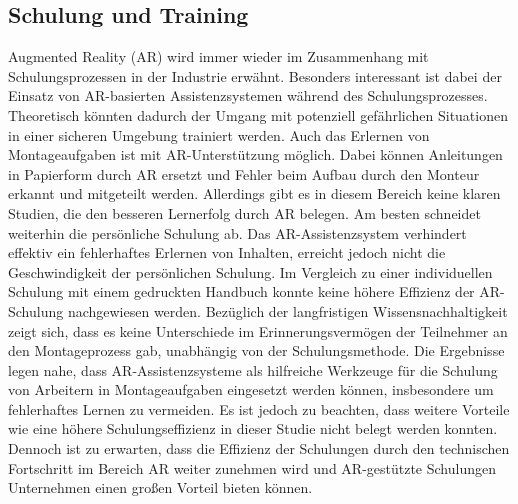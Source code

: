 \subsection{Schulung und Training}
Augmented Reality (AR) wird immer wieder im Zusammenhang mit Schulungsprozessen
in der Industrie erwähnt. Besonders interessant ist dabei der Einsatz von
AR-basierten Assistenzsystemen während des Schulungsprozesses. Theoretisch
könnten dadurch der Umgang mit potenziell gefährlichen Situationen in einer
sicheren Umgebung trainiert werden. Auch das Erlernen von Montageaufgaben ist
mit AR-Unterstützung möglich. Dabei können Anleitungen in Papierform durch AR
ersetzt und Fehler beim Aufbau durch den Monteur erkannt und mitgeteilt werden.
Allerdings gibt es in diesem Bereich keine klaren Studien, die den besseren
Lernerfolg durch AR belegen. Am besten schneidet weiterhin die persönliche
Schulung ab. Das AR-Assistenzsystem verhindert effektiv ein fehlerhaftes
Erlernen von Inhalten, erreicht jedoch nicht die Geschwindigkeit der
persönlichen Schulung. Im Vergleich zu einer individuellen Schulung mit einem
gedruckten Handbuch konnte keine höhere Effizienz der AR-Schulung nachgewiesen
werden. Bezüglich der langfristigen Wissensnachhaltigkeit zeigt sich, dass es
keine Unterschiede im Erinnerungsvermögen der Teilnehmer an den Montageprozess
gab, unabhängig von der Schulungsmethode. Die Ergebnisse legen nahe, dass
AR-Assistenzsysteme als hilfreiche Werkzeuge für die Schulung von Arbeitern in
Montageaufgaben eingesetzt werden können, insbesondere um fehlerhaftes Lernen
zu vermeiden. Es ist jedoch zu beachten, dass weitere Vorteile wie eine höhere
Schulungseffizienz in dieser Studie nicht belegt werden konnten. Dennoch ist zu
erwarten, dass die Effizienz der Schulungen durch den technischen Fortschritt
im Bereich AR weiter zunehmen wird und AR-gestützte Schulungen Unternehmen
einen großen Vorteil bieten können.